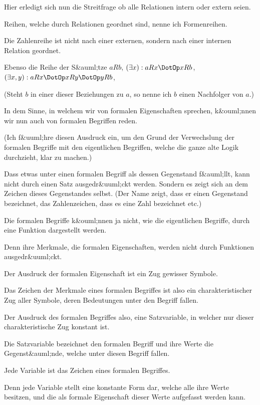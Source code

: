 {Hier erledigt sich nun die Streitfrage \glqq{}ob alle
Relationen intern oder extern\grqq{} seien.}


{Reihen, welche durch  Relationen
geordnet sind, nenne ich Formenreihen.

Die Zahlenreihe ist nicht nach einer externen,
sondern nach einer internen Relation geordnet.

{\stretchyspace
Ebenso die Reihe der S&auml;tze \glqq{}$aRb$\grqq{},
\glqq{}$(\exists x): aRx \DotOp xRb$\grqq{},
\glqq{}$(\exists x,y): aRx \DotOp xRy \DotOp yRb$\grqq{}, \undSoFort}

(Steht $b$ in einer dieser Beziehungen zu $a$, so
nenne ich $b$ einen Nachfolger von $a$.)}


{In dem Sinne, in welchem wir von formalen
Eigenschaften sprechen, k&ouml;nnen wir nun auch
von formalen Begriffen reden.

(Ich f&uuml;hre diesen Ausdruck ein, um den Grund
der Verwechslung der formalen Begriffe mit den
eigentlichen Begriffen, welche die ganze alte Logik
durchzieht, klar zu machen.)

Dass etwas unter einen formalen Begriff als
dessen Gegenstand f&auml;llt, kann nicht durch einen
Satz ausgedr&uuml;ckt werden. Sondern es zeigt sich
an dem Zeichen dieses Gegenstandes selbst. (Der
Name zeigt, dass er einen Gegenstand bezeichnet,
das Zahlenzeichen, dass es eine Zahl bezeichnet etc.)

Die formalen Begriffe k&ouml;nnen ja nicht, wie
die eigentlichen Begriffe, durch eine Funktion
dargestellt werden.

Denn ihre Merkmale, die formalen Eigenschaften,
werden nicht durch Funktionen ausgedr&uuml;ckt.

Der Ausdruck der formalen Eigenschaft ist ein
Zug gewisser Symbole.

Das Zeichen der Merkmale eines formalen
Begriffes ist also ein charakteristischer Zug aller
Symbole, deren Bedeutungen unter den Begriff
fallen.

Der Ausdruck des formalen Begriffes also, eine
Satzvariable, in welcher nur dieser charakteristische
Zug konstant ist.}


{Die Satzvariable bezeichnet den formalen
Begriff und ihre Werte die Gegenst&auml;nde, welche
unter diesen Begriff fallen.}


{Jede Variable ist das Zeichen eines formalen
Begriffes.

Denn jede Variable stellt eine konstante Form
dar, welche alle ihre Werte besitzen, und die als
\enlargethispage{-4pt} %
formale Eigenschaft dieser Werte aufgefasst werden
kann.}


